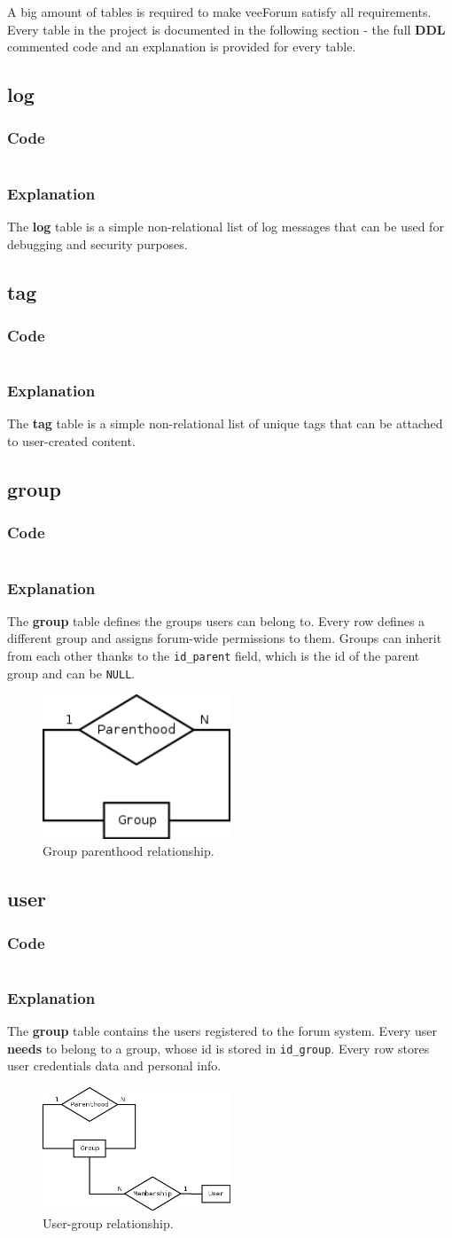 \documentclass[12pt]{report}
\renewcommand\emph{\textbf}
\newcommand{\printSQLtest}[1]
{
    \inputminted[linenos, breaklines, breakbytoken, tabsize=4, fontsize=\footnotesize]{mysql}{#1}
}
\newcommand{\printSQLTablepage}[2]
{
    \newpage
    \subsection{#2}
    \subsubsection{Code}
    \printSQLtest{../sql/parts/#1}
    \subsubsection{Explanation}
}
\begin{document}
                A big amount of tables is required to make veeForum satisfy all requirements. Every table in the project is documented in the following section - the full \emph{DDL} commented code and an explanation is provided for every table.

                \printSQLTablepage{01_tblLog.sql}{log}
                    The \emph{log} table is a simple non-relational list of log messages that can be used for debugging and security purposes.

                \printSQLTablepage{02_tblTag.sql}{tag}
                    The \emph{tag} table is a simple non-relational list of unique tags that can be attached to user-created content.

                \printSQLTablepage{03_tblGroup.sql}{group}
                    The \emph{group} table defines the groups users can belong to. Every row defines a different group and assigns forum-wide permissions to them.
                    Groups can inherit from each other thanks to the \texttt{id_parent} field, which is the id of the parent group and can be \texttt{NULL}.

                    \begin{figure}[h]
                    \caption{Group parenthood relationship.}
                    \centering
                    \includegraphics[width=0.5\textwidth]{td/03group}
                    \end{figure}

                \printSQLTablepage{04_tblUser.sql}{user}
                    The \emph{group} table contains the users registered to the forum system. Every user \emph{needs} to belong to a group, whose id is stored in \texttt{id_group}.
                    Every row stores user credentials data and personal info.

                    \begin{figure}[h]
                    \caption{User-group relationship.}
                    \centering
                    \includegraphics[width=0.5\textwidth]{td/04user}
                    \end{figure}
\end{document}
